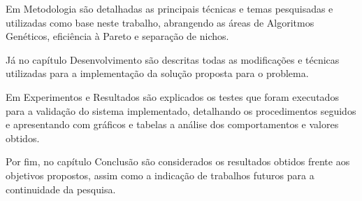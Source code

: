 Em Metodologia são detalhadas as principais técnicas e temas pesquisadas e utilizadas como base neste trabalho, abrangendo as áreas de Algoritmos Genéticos, eficiência à Pareto e separação de nichos.

Já no capítulo Desenvolvimento são descritas todas as modificações e técnicas utilizadas para a implementação da solução proposta para o problema.

Em Experimentos e Resultados são explicados os testes que foram executados para a validação do sistema implementado, detalhando os procedimentos seguidos e apresentando com gráficos e tabelas a análise dos comportamentos e valores obtidos.

Por fim, no capítulo Conclusão são considerados os resultados obtidos frente aos objetivos propostos, assim como a indicação de trabalhos futuros para a continuidade da pesquisa.